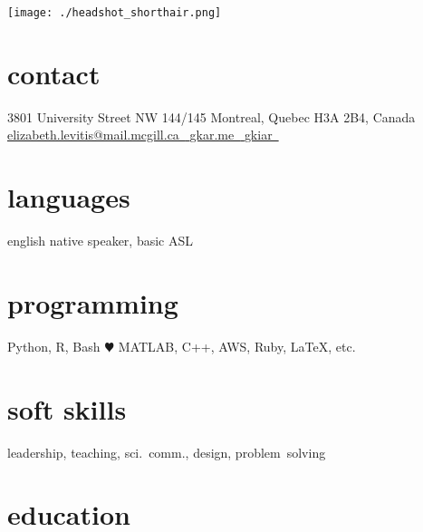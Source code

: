 \documentclass[]{friggeri-cv} %
\begin{document}


\begin{aside} %
\texttt{[image: ./headshot\_shorthair.png]}
\section{contact}
3801 University Street
NW 144/145
Montreal, Quebec
H3A 2B4, Canada
~
\href{mailto:elizabeth.levitis@mail.mcgill.ca}{elizabeth.levitis@mail.mcgill.ca~{\color{red} \faEnvelope}}
\href{http://gkiar.github.io}{gkar.me~{\color{lightblue} \faGlobe}}
\href{http://github.com/gkiar}{gkiar~{\color{purple} \faGithub}}
\href{https://twitter.com/g_kiar}{{\color{blue} \faTwitter}} \href{https://www.linkedin.com/in/gregkiar}{{\color{green} \faLinkedin}} \href{https://publons.com/author/1305375/gregory-kiar#profile}{{\color{plubblue} \aiPublons}} \href{http://orcid.org/0000-0001-8915-496X}{{\color{orcidgreen} \aiOrcid}} \href{https://scholar.google.com/citations?user=ztw6g7kAAAAJ&hl=en}{{\color{googred} \aiGoogleScholar}} \href{https://www.researchgate.net/profile/Gregory_Kiar}{{\color{gateteal} \aiResearchGate}}
\section{languages}
english native speaker,
basic ASL
\section{programming}
Python, R, Bash {\color{red} $\varheartsuit$}
MATLAB, C++, AWS,
Ruby, LaTeX, etc.
\section{soft skills}
leadership, teaching, sci.~comm., design, problem~solving
\end{aside}


\section{education}
\end{document}
